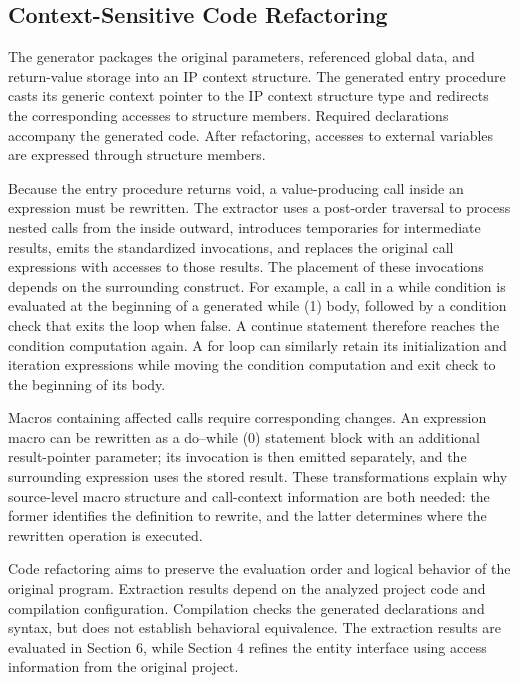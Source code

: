 \documentclass[manuscript, screen, review]{acmart}
\begin{document}
\subsection{Context-Sensitive Code Refactoring}

The generator packages the original parameters, referenced global data, and return-value storage into an IP context structure. The generated entry procedure casts its generic context pointer to the IP context structure type and redirects the corresponding accesses to structure members. Required declarations accompany the generated code. After refactoring, accesses to external variables are expressed through structure members.

Because the entry procedure returns void, a value-producing call inside an expression must be rewritten. The extractor uses a post-order traversal to process nested calls from the inside outward, introduces temporaries for intermediate results, emits the standardized invocations, and replaces the original call expressions with accesses to those results. The placement of these invocations depends on the surrounding construct. For example, a call in a while condition is evaluated at the beginning of a generated while (1) body, followed by a condition check that exits the loop when false. A continue statement therefore reaches the condition computation again. A for loop can similarly retain its initialization and iteration expressions while moving the condition computation and exit check to the beginning of its body.

Macros containing affected calls require corresponding changes. An expression macro can be rewritten as a do–while (0) statement block with an additional result-pointer parameter; its invocation is then emitted separately, and the surrounding expression uses the stored result. These transformations explain why source-level macro structure and call-context information are both needed: the former identifies the definition to rewrite, and the latter determines where the rewritten operation is executed.

Code refactoring aims to preserve the evaluation order and logical behavior of the original program. Extraction results depend on the analyzed project code and compilation configuration. Compilation checks the generated declarations and syntax, but does not establish behavioral equivalence. The extraction results are evaluated in Section 6, while Section 4 refines the entity interface using access information from the original project.
\end{document}
